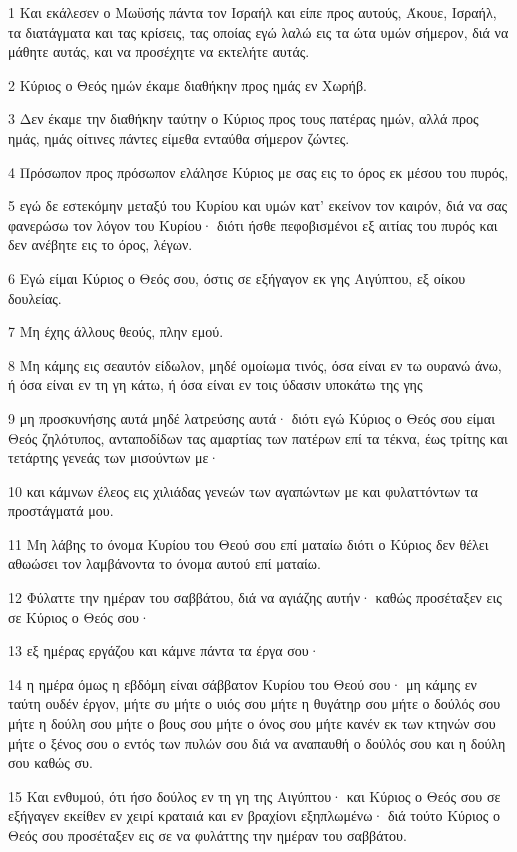\par 1 Και εκάλεσεν ο Μωϋσής πάντα τον Ισραήλ και είπε προς αυτούς, Άκουε, Ισραήλ, τα διατάγματα και τας κρίσεις, τας οποίας εγώ λαλώ εις τα ώτα υμών σήμερον, διά να μάθητε αυτάς, και να προσέχητε να εκτελήτε αυτάς.
\par 2 Κύριος ο Θεός ημών έκαμε διαθήκην προς ημάς εν Χωρήβ.
\par 3 Δεν έκαμε την διαθήκην ταύτην ο Κύριος προς τους πατέρας ημών, αλλά προς ημάς, ημάς οίτινες πάντες είμεθα ενταύθα σήμερον ζώντες.
\par 4 Πρόσωπον προς πρόσωπον ελάλησε Κύριος με σας εις το όρος εκ μέσου του πυρός,
\par 5 εγώ δε εστεκόμην μεταξύ του Κυρίου και υμών κατ' εκείνον τον καιρόν, διά να σας φανερώσω τον λόγον του Κυρίου· διότι ήσθε πεφοβισμένοι εξ αιτίας του πυρός και δεν ανέβητε εις το όρος, λέγων.
\par 6 Εγώ είμαι Κύριος ο Θεός σου, όστις σε εξήγαγον εκ γης Αιγύπτου, εξ οίκου δουλείας.
\par 7 Μη έχης άλλους θεούς, πλην εμού.
\par 8 Μη κάμης εις σεαυτόν είδωλον, μηδέ ομοίωμα τινός, όσα είναι εν τω ουρανώ άνω, ή όσα είναι εν τη γη κάτω, ή όσα είναι εν τοις ύδασιν υποκάτω της γης
\par 9 μη προσκυνήσης αυτά μηδέ λατρεύσης αυτά· διότι εγώ Κύριος ο Θεός σου είμαι Θεός ζηλότυπος, ανταποδίδων τας αμαρτίας των πατέρων επί τα τέκνα, έως τρίτης και τετάρτης γενεάς των μισούντων με·
\par 10 και κάμνων έλεος εις χιλιάδας γενεών των αγαπώντων με και φυλαττόντων τα προστάγματά μου.
\par 11 Μη λάβης το όνομα Κυρίου του Θεού σου επί ματαίω διότι ο Κύριος δεν θέλει αθωώσει τον λαμβάνοντα το όνομα αυτού επί ματαίω.
\par 12 Φύλαττε την ημέραν του σαββάτου, διά να αγιάζης αυτήν· καθώς προσέταξεν εις σε Κύριος ο Θεός σου·
\par 13 εξ ημέρας εργάζου και κάμνε πάντα τα έργα σου·
\par 14 η ημέρα όμως η εβδόμη είναι σάββατον Κυρίου του Θεού σου· μη κάμης εν ταύτη ουδέν έργον, μήτε συ μήτε ο υιός σου μήτε η θυγάτηρ σου μήτε ο δούλός σου μήτε η δούλη σου μήτε ο βους σου μήτε ο όνος σου μήτε κανέν εκ των κτηνών σου μήτε ο ξένος σου ο εντός των πυλών σου διά να αναπαυθή ο δούλός σου και η δούλη σου καθώς συ.
\par 15 Και ενθυμού, ότι ήσο δούλος εν τη γη της Αιγύπτου· και Κύριος ο Θεός σου σε εξήγαγεν εκείθεν εν χειρί κραταιά και εν βραχίονι εξηπλωμένω· διά τούτο Κύριος ο Θεός σου προσέταξεν εις σε να φυλάττης την ημέραν του σαββάτου.
